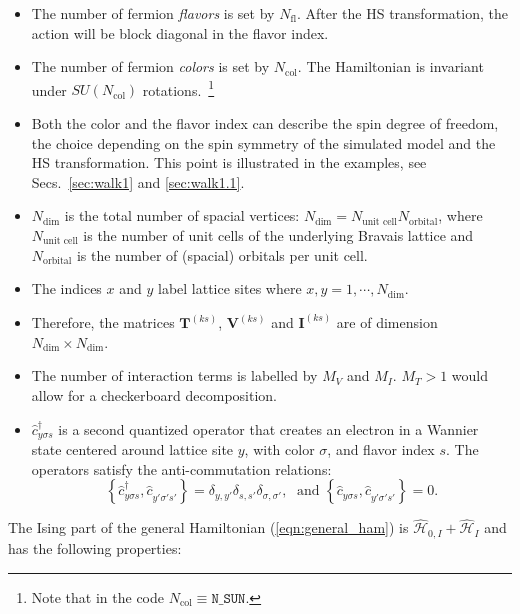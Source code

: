 \documentclass{SciPost}
\begin{document}
\begin{itemize}
\item The number of fermion \textit{flavors} is set by $N_{\mathrm{fl}}$.  After the HS transformation, the action will be block diagonal in the flavor index. 
\item The number of fermion \textit{colors} is set by $N_{\mathrm{col}}$.    The Hamiltonian is invariant under  $SU(N_{\mathrm{col}})$  rotations.~\footnote{Note that  in the code $ N_{\mathrm{col}} \equiv \texttt{N\_{SUN}} $.} 

\item Both the color and the flavor index can describe the spin degree of freedom, the choice depending on the spin symmetry 
of the simulated model and the HS transformation. This point is illustrated in the examples, see Secs.~\ref{sec:walk1} and \ref{sec:walk1.1}.

\item $N_{\mathrm{dim}}$ is the total number of spacial vertices: $N_{\mathrm{dim}}=N_{\text{unit cell}} N_{\mathrm{orbital}}$, 
where $N_{\text{unit cell}}$ is the number of unit cells of the underlying Bravais lattice and $N_{\mathrm{orbital}}$ is the number of (spacial) orbitals per unit cell.
\item The indices $x$ and $y$ label lattice sites where $x,y=1,\cdots, N_{\mathrm{dim}}$. 
\item Therefore, the  matrices $\bm{T}^{(k s)}$, $\bm{V}^{(ks)}$  and $\bm{I}^{(ks)}$ are  of dimension $N_{\mathrm{dim}}\times N_{\mathrm{dim}}$.
\item The number of interaction terms  is labelled by $M_V$   and $M_I$.   $M_T> 1 $ would allow for a checkerboard decomposition.
\item $\hat{c}^{\dagger}_{y \sigma s} $ is a second quantized operator that creates an electron in a Wannier state centered around lattice site $y$, with color $\sigma$, and  flavor index $s$.  The operators satisfy the anti-commutation relations: 
\begin{equation}
	\left\{ \hat{c}^{\dagger}_{y \sigma s},    \hat{c}^{\phantom\dagger}_{y' \sigma' s'}  \right\}   =   \delta_{y,y'}  \delta_{s,s'} \delta_{\sigma,\sigma'},   
	\; \text{ and } \left\{ \hat{c}^{\phantom\dagger}_{y \sigma s},    \hat{c}^{\phantom\dagger}_{y' \sigma' s'}  \right\}   =0.
\end{equation}

\end{itemize}
The Ising part of the general Hamiltonian (\ref{eqn:general_ham}) is $\hat{\mathcal{H}}_{0,I}+ \hat{\mathcal{H}}_{I}$ and  has the following properties:
\end{document}
